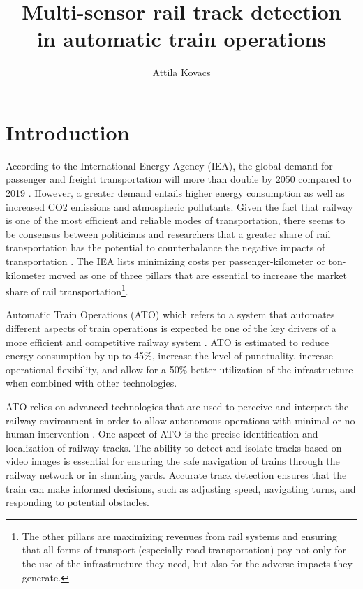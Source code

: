 \documentclass[Master,MDS,english]{BASE/twbook} %
\title{Multi-sensor rail track detection \\ in automatic train operations}
\author{Attila Kovacs}
\begin{document}
\maketitle

\chapter{Introduction} %


According to the International Energy Agency (IEA), the global demand for passenger and freight transportation will more than double by 2050 compared to 2019 \citep{IEA2019}. However, a greater demand entails higher energy consumption as well as increased CO2 emissions and atmospheric pollutants.  
Given the fact that railway is one of the most efficient and reliable modes of transportation, there seems to be consensus between politicians and researchers that a greater share of rail transportation has the potential to counterbalance the negative impacts of transportation \citep{islam2016make, pagand2020fostering}.
The IEA lists minimizing costs per passenger-kilometer or ton-kilometer moved as one of three pillars that are essential to increase the market share of rail transportation\footnote {The other pillars are maximizing revenues from rail systems and ensuring that all forms of transport (especially road transportation) pay not only for the use of the infrastructure they need, but also for the adverse impacts they generate.}.

Automatic Train Operations (ATO) which refers to a system that automates different aspects of train operations is expected be one of the key drivers of a more efficient and competitive railway system \citep{ERJU2019, ALSTOM2021}. ATO is estimated to reduce energy consumption by up to 45\%, increase the level of punctuality, increase operational flexibility, and allow for a 50\% better utilization of the infrastructure when combined with other technologies.

ATO relies on advanced technologies that are used to perceive and interpret the railway environment in order to allow autonomous operations with minimal or no human intervention \citep{DB2024}. 
One aspect of ATO is the precise identification and localization of railway tracks. The ability to detect and isolate tracks based on video images is essential for ensuring the safe navigation of trains through the railway network or in shunting yards. Accurate track detection ensures that the train can make informed decisions, such as adjusting speed, navigating turns, and responding to potential obstacles.
\end{document}
